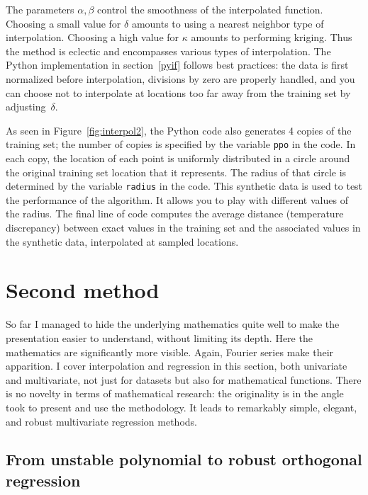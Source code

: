 \documentclass[oneside,10pt]{book}
\begin{document}
The parameters $\alpha,\beta$ control the smoothness of the interpolated function. Choosing a small value for $\delta$ amounts to using a nearest neighbor type of interpolation. Choosing a high value for $\kappa$ amounts to performing kriging. Thus the method is eclectic and encompasses various types of interpolation. The Python implementation in section~\ref{pyif} follows best practices: the data is first normalized before interpolation, divisions by zero are properly handled, and you can choose not to interpolate at locations too far away from the training set by adjusting~$\delta$.

As seen in Figure~\ref{fig:interpol2}, the Python code also generates 4 copies of the training set; the number of copies is specified by the variable
\texttt{ppo} in the code. In each copy, the location of each point is uniformly distributed in a circle around the original training set location that it represents. The radius of that circle is determined by the variable \texttt{radius} in the code. This
\textcolor{index}{synthetic data} is used to test the performance of the algorithm. It allows you to play with different values of the radius. The final line of code computes the average distance (temperature discrepancy) between exact values in the training set and the associated values in the synthetic data, interpolated at sampled locations.



\section{Second method}

So far I managed to hide the underlying mathematics quite well to make the presentation easier to understand, without limiting its depth. Here the mathematics are significantly  more visible. Again, Fourier series make their apparition. I cover interpolation and regression in this section, both univariate and multivariate, not just for datasets but also for mathematical functions. There is no novelty in terms of mathematical research: the originality is in the angle took to present and use the methodology. It leads to remarkably simple, elegant, and robust multivariate regression methods.

\subsection{From unstable polynomial to robust orthogonal  regression}
\end{document}
